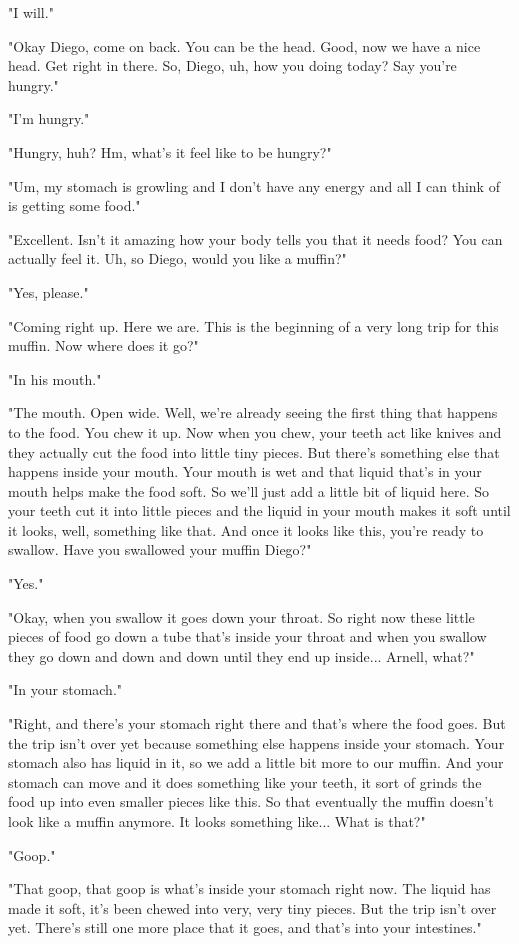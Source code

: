 "I will."

"Okay Diego, come on back. You can be the head. Good, now we have a nice head. Get right in there. So, Diego, uh, how you doing today? Say you're hungry."

"I'm hungry."

"Hungry, huh? Hm, what's it feel like to be hungry?"

"Um, my stomach is growling and I don't have any energy and all I can think of is getting some food."

"Excellent. Isn't it amazing how your body tells you that it needs food? You can actually feel it. Uh, so Diego, would you like a muffin?"

"Yes, please."

"Coming right up. Here we are. This is the beginning of a very long trip for this muffin. Now where does it go?"

"In his mouth."

"The mouth. Open wide. Well, we're already seeing the first thing that happens to the food. You chew it up. Now when you chew, your teeth act like knives and they actually cut the food into little tiny pieces. But there's something else that happens inside your mouth. Your mouth is wet and that liquid that's in your mouth helps make the food soft. So we'll just add a little bit of liquid here. So your teeth cut it into little pieces and the liquid in your mouth makes it soft until it looks, well, something like that. And once it looks like this, you're ready to swallow. Have you swallowed your muffin Diego?"

"Yes."

"Okay, when you swallow it goes down your throat. So right now these little pieces of food go down a tube that's inside your throat and when you swallow they go down and down and down until they end up inside... Arnell, what?"

"In your stomach."

"Right, and there's your stomach right there and that's where the food goes. But the trip isn't over yet because something else happens inside your stomach. Your stomach also has liquid in it, so we add a little bit more to our muffin. And your stomach can move and it does something like your teeth, it sort of grinds the food up into even smaller pieces like this. So that eventually the muffin doesn't look like a muffin anymore. It looks something like... What is that?"

"Goop."

"That goop, that goop is what's inside your stomach right now. The liquid has made it soft, it's been chewed into very, very tiny pieces. But the trip isn't over yet. There's still one more place that it goes, and that's into your intestines."

